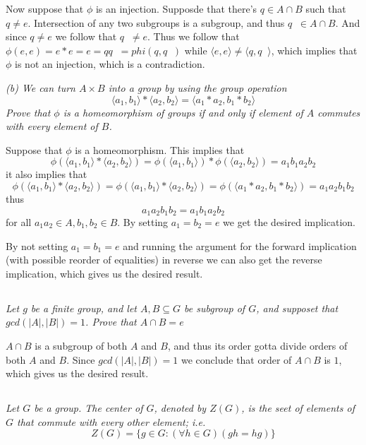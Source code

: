\documentclass[11pt,oneside,titlepage]{book}
\DeclareMathOperator \inv {^{-1}}
\newcommand{\eangle}[1]{\langle #1 \rangle}
\newcommand{\set}[1]{\{ #1 \}}
\begin{document}
Now suppose that $\phi$ is an injection. Supposde that there's $q \in
A \cap B$ such that $q \neq e$. Intersection of any two subgroups is a
subgroup, and thus $q\inv \in A \cap B$. And since $q \neq e$ we
follow that $q\inv \neq e$. Thus we follow that $\phi(e, e) = e * e =
e = q q\inv = phi(q, q\inv)$ while $\eangle{e, e} \neq \eangle{q,
q\inv}$, which implies that $\phi$ is not an injection, which is a
contradiction.

\textit{(b) We can turn $A \times B$ into a group by using the group
  operation
  $$\eangle{a_1, b_1} * \eangle{a_2, b_2}  = \eangle{a_1* a_2, b_1 * b_2}$$
  Prove that $\phi$ is a homeomorphism of groups if and only if element of $A$
  commutes with every element of $B$.}

Suppose that $\phi$ is a homeomorphism. This implies that
$$\phi(\eangle{a_1, b_1} * \eangle{a_2, b_2}) =
\phi(\eangle{a_1, b_1}) * \phi(\eangle{a_2, b_2}) =
a_1 b_1 a_2 b_2 $$
it also implies that 
$$\phi(\eangle{a_1, b_1} * \eangle{a_2, b_2}) =
\phi(\eangle{a_1, b_1} * \eangle{a_2, b_2}) =
\phi(\eangle{a_1 * a_2 , b_1 * b_2}) =
a_1 a_2 b_1 b_2 $$
thus
$$a_1 a_2 b_1 b_2 = a_1 b_1 a_2 b_2$$
for all $a_1 a_2 \in A, b_1, b_2 \in B$. By setting $a_1 = b_2 = e$ we
get the desired implication.

By not setting $a_1 = b_1 = e$ and running the argument for the
forward implication (with possible reorder of equalities) in reverse
we can also get the reverse implication, which gives us the desired
result.

\subsection{}

\textit{Let $g$ be a finite group, and let $A, B \subseteq G$ be
subgroup of $G$, and supposet that $gcd(|A|, |B|) = 1$. Prove that $A
\cap B = e$}

$A \cap B$ is a subgroup of both $A$ and $B$, and thus its order gotta
divide orders of both $A$ and $B$. Since $gcd(|A|, |B|) = 1$ we
conclude that order of $A \cap B$ is $1$, which gives us the desired
result.

\subsection{}

\textit{Let $G$ be a group. The center of $G$, denoted by $Z(G)$, is
the seet of elements of $G$ that commute with every other element;
i.e.
$$Z(G) = \set{g \in G: (\forall h \in G)(gh = hg) }$$}
\end{document}

